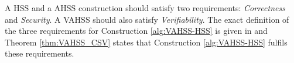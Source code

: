 A HSS and a AHSS construction should satisfy  two requirements: \textit{Correctness} and \textit{Security}. A VAHSS should also satisfy \textit{Verifiability}. The exact definition of the three requirements for Construction \ref{alg:VAHSS-HSS} is given in \cite{SumItUp} and Theorem \ref{thm:VAHSS_CSV} states that Construction \ref{alg:VAHSS-HSS} fulfils these requirements. 
\begin{comment}
\begin{itemize}
    \item \textbf{Correctness} It must hold that Pr$\Big[\textbf{Verify}(\{\tau_i\}_{i\in\mathcal{N}},\sigma,y)=1\Big]=1$. This means that with probability $1$ the output $y$ from \textbf{FinalEval} is accepted given all parties where honest and the protocol were executed correctly.
    \item \textbf{Security} Let $T$ define the set of corrupted servers such that $|T|<m$, i.e at least one server is honest.  Denote a PPT adversary by $\mathcal{A}_1$ and let the Adv$(1^\lambda,\mathcal{A},T):= \text{Pr}[b' = b]-1/2$ be the advantage of $\mathcal{A}=\{\mathcal{A}_1,\mathcal{D}\}$ in guessing $b$ in the following experiment:
    \begin{enumerate}
        \item The adversary $\mathcal{A}_1$ gives $(i,x_i,x_i')$ to the challenger, where $i\in[n], x_i\neq x_i'$ and $|x_i|=|x_i'|$.
        \item The challenger picks a bit $b\in\{0,1\}$ uniformly at random chooses and computes $\textbf{ShareSecret}(1^\lambda,i,\hat{x}_i) = (\hat{\text{share}}_{i1},...,\hat{\text{share}}_{im},\tau_i)$, where $\hat{\textbf{x}}_i$ is  such that $\hat{x}_i = \begin{cases}x_i, \text{ if } b=0 \\ x_i' \text{ else} \end{cases}$. 
        \item Given the shares from the corrupted servers T and $\hat{\tau}_i$ the adversary distinguisger outputs a guess $b'\xleftarrow[]{}\mathcal{D}((\hat{\text{share}_{ij}})_{j|s_j\in T},\hat{\tau}_i)$.
    \end{enumerate}
    A VAHSS-construction is $t$-secure if for all $T\subset \{s_1,...,s_m\}$ with $|T|<t$ it holds that Adv$(1^\lambda,\mathcal{A},T)<\varepsilon(\lambda)$ for some negligible $\varepsilon(\lambda)$.
 \item \textbf{Verifiability} Let $\mathcal{A}$ denote any PPT  adversary and $T$ denote the set of corrupted servers with $T\leq m$. The verifiability property requires that any $\mathcal{A}$ who can modify the input shares to all servers $s_j\in T$ can cause a wrong value to be excepted as $y=f(x_1,...,x_n)$ with negligible probability.   
\end{itemize}
The VHASS in Construction \ref{alg:VAHSS-HSS} satisfies the correctness, security and verifiability requirements defined above, this is stated in Theorem \ref{thm:VAHSS_CSV} .
\end{comment}

